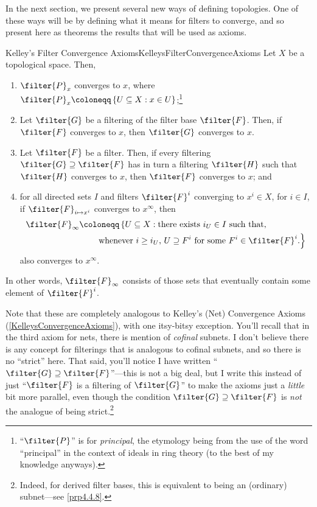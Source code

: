 In the next section, we present several new ways of defining topologies.  One of these ways will be by defining what it means for filters to converge, and so present here as theorems the results that will be used as axioms.
\begin{prp}{Kelley's Filter Convergence Axioms}{KelleysFilterConvergenceAxioms}
Let $X$ be a topological space.  Then,
\begin{enumerate}
\item \label{enmKelleysFilterConvergenceAxioms.i}$\filter{P}_x$ converges to $x$, where $\filter{P}_x\coloneqq \left\{ U\subseteq X:x\in U\right\}$;\footnote{``$\filter{P}$'' is for \emph{principal}, the etymology being from the use of the word ``principal'' in the context of ideals in ring theory (to the best of my knowledge anyways).}
\item \label{enmKelleysFilterConvergenceAxioms.iix}Let $\filter{G}$ be a filtering of the filter base $\filter{F}$.  Then, if $\filter{F}$ converges to $x$, then $\filter{G}$ converges to $x$.
\item \label{enmKelleysFilterConvergenceAxioms.ii}Let $\filter{F}$ be a filter.  Then, if every filtering $\filter{G}\supseteq \filter{F}$ has in turn a filtering $\filter{H}$ such that $\filter{H}$ converges to $x$, then $\filter{F}$ converges to $x$; and
\item \label{enmKelleysFilterConvergenceAxioms.iii}for all directed sets $I$ and filters $\filter{F}^i$ converging to $x^i\in X$, for $i\in I$, if $\filter{F}_{i\mapsto x^i}$ converges to $x^\infty$, then
\begin{equation*}
\begin{split}
\filter{F}_\infty & \coloneqq \left\{ U\subseteq X:\text{there exists }i_U\in I\text{ such that,}\right. \\
& \qquad \left. \text{whenever }i\geq i_U\text{, }U\supseteq F^i\text{ for some }F^i\in \filter{F}^i.\right\}
\end{split}
\end{equation*}
also converges to $x^\infty$.
\end{enumerate}
\begin{rmk}
In other words, $\filter{F}_{\infty}$ consists of those sets that eventually contain some element of $\filter{F}^i$.
\end{rmk}
\begin{rmk}
Note that these are completely analogous to Kelley's (Net) Convergence Axioms (\cref{KelleysConvergenceAxioms}), with one itsy-bitsy exception.  You'll recall that in the third axiom for nets, there is mention of \emph{cofinal} subnets.  I don't believe there is any concept for filterings that is analogous to cofinal subnets, and so there is no ``strict'' here.  That said, you'll notice I have written ``$\filter{G}\supseteq \filter{F}$''---this is not a big deal, but I write this instead of just ``$\filter{F}$ is a filtering of $\filter{G}$'' to make the axioms just a \emph{little} bit more parallel, even though the condition $\filter{G}\supseteq \filter{F}$ is \emph{not} the analogue of being strict.\footnote{Indeed, for derived filter bases, this is equivalent to being an (ordinary) subnet---see \cref{prp4.4.8}.}

\end{rmk}
\end{prp}
